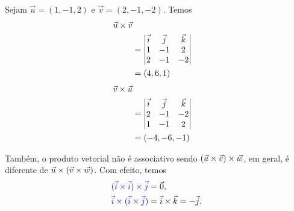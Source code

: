 \begin{ex}
  Sejam $\vec{u}=(1,-1,2)$ e $\vec{v}=(2,-1,-2)$. Temos
  \begin{align}
    \vec{u}\times\vec{v} \\
    &= \begin{vmatrix}
      \vec{i} & \vec{j} & \vec{k} \\
      1 & -1 & 2 \\
      2 & -1 & -2                                    
    \end{vmatrix} \\
    &= (4,6,1)
  \end{align}
  \begin{align}
    \vec{v}\times\vec{u} \\
    &= \begin{vmatrix}
      \vec{i} & \vec{j} & \vec{k} \\
      2 & -1 & -2 \\
      1 & -1 & 2
    \end{vmatrix} \\
    &= (-4,-6,-1)
  \end{align}
\end{ex}

Também, o {\color{blue}produto vetorial não é associativo} sendo $(\vec{u}\times\vec{v})\times\vec{w}$, em geral, é diferente de $\vec{u}\times(\vec{v}\times\vec{w})$. Com efeito, temos
\begin{align}
  {\color{blue}(\vec{i}\times\vec{i})\times\vec{j}} &= \vec{0},\\
  {\color{blue}\vec{i}\times(\vec{i}\times\vec{j})} &= \vec{i}\times\vec{k} = -\vec{j}.
\end{align}

